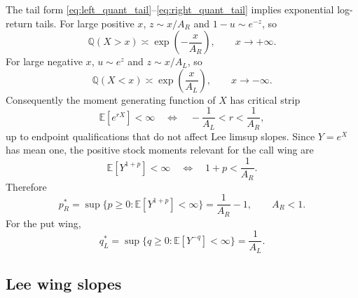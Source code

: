 \documentclass[11pt]{article}
\newcommand{\E}{\mathbb{E}}
\newcommand{\Q}{\mathbb{Q}}
\newcommand{\1}{\mathbf{1}}
\begin{document}
The tail form \eqref{eq:left_quant_tail}--\eqref{eq:right_quant_tail} implies exponential log-return tails.  For large positive $x$, $z\sim x/A_R$ and $1-u\sim e^{-z}$, so
\begin{equation}
    \Q(X>x)\asymp \exp\left(-\frac{x}{A_R}\right),\qquad x\to+\infty. \label{eq:right_survival}
\end{equation}
For large negative $x$, $u\sim e^z$ and $z\sim x/A_L$, so
\begin{equation}
    \Q(X<x)\asymp \exp\left(\frac{x}{A_L}\right),\qquad x\to-\infty. \label{eq:left_survival}
\end{equation}
Consequently the moment generating function of $X$ has critical strip
\begin{equation}
    \E[e^{rX}]<\infty
    \quad\Longleftrightarrow\quad
    -\frac{1}{A_L}<r<\frac{1}{A_R}, \label{eq:mgf_strip}
\end{equation}
up to endpoint qualifications that do not affect Lee limsup slopes.  Since $Y=e^X$ has mean one, the positive stock moments relevant for the call wing are
\begin{equation}
    \E[Y^{1+p}]<\infty
    \quad\Longleftrightarrow\quad
    1+p<\frac{1}{A_R}.
\end{equation}
Therefore
\begin{equation}
    p^*_R=\sup\{p\ge0:\E[Y^{1+p}]<\infty\}=\frac{1}{A_R}-1,\qquad A_R<1.\label{eq:pstar}
\end{equation}
For the put wing,
\begin{equation}
    q^*_L=\sup\{q\ge0:\E[Y^{-q}]<\infty\}=\frac{1}{A_L}.\label{eq:qstar}
\end{equation}

\subsection{Lee wing slopes}
\end{document}
